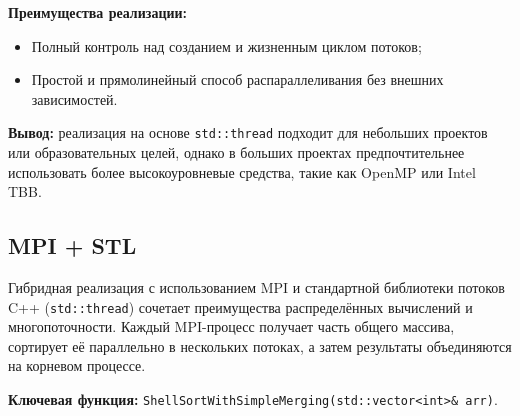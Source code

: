 \documentclass[12pt]{article}
\begin{document}
\textbf{Преимущества реализации:}
\begin{itemize}
  \item Полный контроль над созданием и жизненным циклом потоков;
  \item Простой и прямолинейный способ распараллеливания без внешних зависимостей.
\end{itemize}

\textbf{Вывод:} реализация на основе \texttt{std::thread} подходит для небольших проектов или образовательных целей, однако в больших проектах предпочтительнее использовать более высокоуровневые средства, такие как OpenMP или Intel TBB.


\subsection{MPI + STL}

Гибридная реализация с использованием MPI и стандартной библиотеки потоков C++ (\texttt{std::thread}) сочетает преимущества распределённых вычислений и многопоточности. Каждый MPI-процесс получает часть общего массива, сортирует её параллельно в нескольких потоках, а затем результаты объединяются на корневом процессе.

\textbf{Ключевая функция:} \texttt{ShellSortWithSimpleMerging(std::vector<int>\& arr)}.
\end{document}
